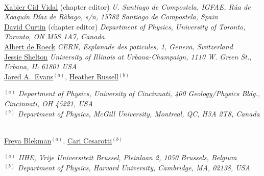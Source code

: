 \\

\noindent\href{mailto:xabier.cid.vidal@cern.ch}{Xabier Cid Vidal} (chapter editor) 
\emph{U. Santiago de Compostela, IGFAE, R\'ua de Xoaqu\'in D\'iaz de R\`abago, s/n, 15782 Santiago de Compostela, Spain}\\
\noindent\href{mailto:dcurtin@physics.utoronto.ca}{David Curtin} (chapter editor)
\emph{Department of Physics, University of Toronto, Toronto, ON M5S 1A7, Canada}\\
\noindent\href{mailto:deroeck@mail.cern.ch}{Albert de Roeck} 
\emph{CERN, Esplanade des paticules, 1, Geneva,  Switzerland}\\
\noindent\href{mailto:sheltonj@illinois.edu}{Jessie Shelton} 
\emph{University of Illinois at Urbana-Champaign, 1110 W. Green St., Urbana, IL 61801 USA}\\

\noindent\href{mailto:jaredaevans@gmail.com}{Jared A.~Evans}$^{(a)}$,
\noindent\href{mailto:hrussell@cern.ch}{Heather Russell}$^{(b)}$\\

\vspace{0.5cm}

{\footnotesize
\begin{center}
$^{(a)}$ \emph{Department of Physics, University of Cincinnati, 400 Geology/Physics Bldg., Cincinnati, OH 45221, USA}\\
$^{(b)}$ \emph{Department of Physics, McGill University, Montreal, QC, H3A 2T8, Canada}
\end{center}}


\vspace{0.25cm}

\\

\noindent\href{mailto:freya.blekman@cern.ch}{Freya Blekman}$^{(a)}$,
\noindent\href{mailto:ccesarotti@g.harvard.edu}{Cari Cesarotti}$^{(b)}$\\

\vspace{0.25cm}

{\footnotesize
\begin{center}
$^{(a)}$ \emph{IIHE, Vrije Universiteit Brussel, Pleinlaan 2, 1050 Brussels, Belgium}\\
$^{(b)}$ \emph{Department of Physics, Harvard University, Cambridge, MA, 02138, USA}
\end{center}}